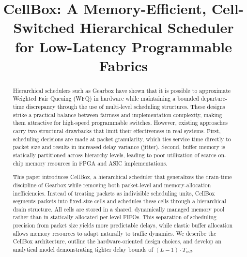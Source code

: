 \documentclass[conference]{IEEEtran}
\begin{document}
\title{CellBox: A Memory-Efficient, Cell-Switched Hierarchical Scheduler for Low-Latency Programmable Fabrics}

\author{
\and
{}
}

\maketitle

\begin{abstract}
Hierarchical schedulers such as Gearbox have shown that it is possible to approximate Weighted Fair Queuing (WFQ) in hardware while maintaining a bounded departure-time discrepancy through the use of multi-level scheduling structures. These designs strike a practical balance between fairness and implementation complexity, making them attractive for high-speed programmable switches. However, existing approaches carry two structural drawbacks that limit their effectiveness in real systems. First, scheduling decisions are made at packet granularity, which ties service time directly to packet size and results in increased delay variance (jitter). Second, buffer memory is statically partitioned across hierarchy levels, leading to poor utilization of scarce on-chip memory resources in FPGA and ASIC implementations.

This paper introduces CellBox, a hierarchical scheduler that generalizes the drain-time discipline of Gearbox while removing both packet-level and memory-allocation inefficiencies. Instead of treating packets as indivisible scheduling units, CellBox segments packets into fixed-size cells and schedules these cells through a hierarchical drain structure. All cells are stored in a shared, dynamically managed memory pool rather than in statically allocated per-level FIFOs. This separation of scheduling precision from packet size yields more predictable delays, while elastic buffer allocation allows memory resources to adapt naturally to traffic dynamics. We describe the CellBox architecture, outline the hardware-oriented design choices, and develop an analytical model demonstrating tighter delay bounds of $(L-1) \cdot T_{cell}$.
\end{abstract}
\end{document}
